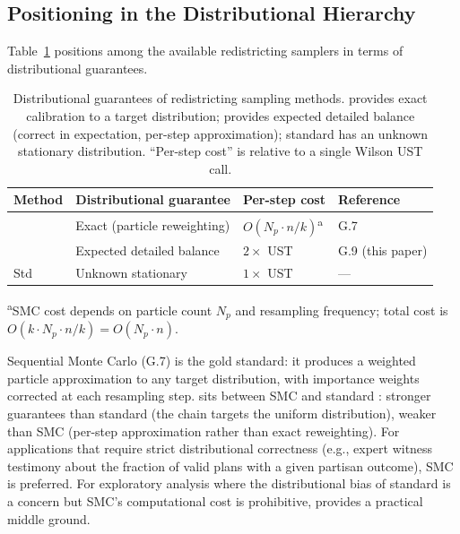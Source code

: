 \subsection{Positioning in the Distributional Hierarchy}

Table~\ref{tab:hierarchy} positions \fr{} among the available redistricting
samplers in terms of distributional guarantees.

\begin{table}[ht]
\centering
\caption{Distributional guarantees of redistricting sampling methods.
  \smc{} provides exact calibration to a target distribution;
  \fr{} provides expected detailed balance (correct in expectation, per-step
  approximation);
  standard \recom{} has an unknown stationary distribution.
  ``Per-step cost'' is relative to a single Wilson UST call.}
\label{tab:hierarchy}
\renewcommand{\arraystretch}{1.35}
\begin{tabular}{@{}llll@{}}
\toprule
Method & Distributional guarantee & Per-step cost & Reference \\
\midrule
\smc{}~\citep{dellaLibera2026smc} & Exact (particle reweighting) & $O(N_p \cdot n/k)$\textsuperscript{a} & G.7 \\
\fr{}~\citep{mccartan2020}        & Expected detailed balance    & $2 \times$ UST        & G.9 (this paper) \\
Std \recom{}~\citep{deford2021}   & Unknown stationary           & $1 \times$ UST        & --- \\
\bottomrule
\end{tabular}
\footnotesize\textsuperscript{a}SMC cost depends on particle count $N_p$ and
resampling frequency; total cost is
$O(k \cdot N_p \cdot n/k) = O(N_p \cdot n)$.
\end{table}

Sequential Monte Carlo (G.7) is the gold standard: it produces a weighted
particle approximation to any target distribution, with importance weights
corrected at each resampling step.
\fr{} sits between SMC and standard \recom{}:
stronger guarantees than standard \recom{} (the chain targets the uniform
distribution), weaker than SMC (per-step approximation rather than exact
reweighting).
For applications that require strict distributional correctness (e.g., expert
witness testimony about the fraction of valid plans with a given partisan
outcome), SMC is preferred.
For exploratory analysis where the distributional bias of standard \recom{}
is a concern but SMC's computational cost is prohibitive, \fr{} provides a
practical middle ground.
